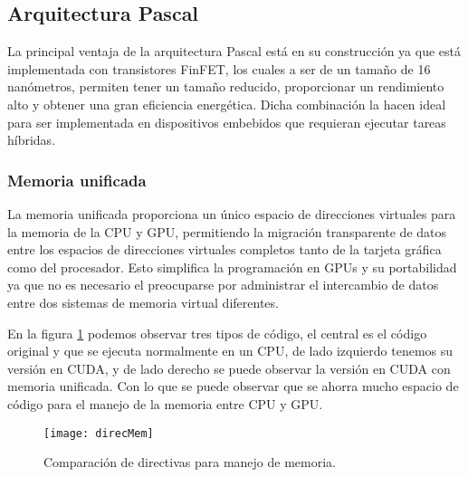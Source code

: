     \subsection{Arquitectura Pascal}\label{secc:arqPas}

    La principal ventaja de la arquitectura Pascal está en su construcción ya que está implementada con transistores FinFET\cite{PasGPU}, los cuales a ser de un tamaño de 16 nanómetros, permiten tener un tamaño reducido, proporcionar un rendimiento alto y obtener una gran eficiencia energética. Dicha combinación la hacen ideal para ser implementada en dispositivos embebidos que requieran ejecutar tareas híbridas.
                 
   \vspace{0.3cm}
   
    \subsubsection{Memoria unificada} \label{sec:MemUni}
     La memoria unificada proporciona un único espacio de direcciones virtuales para la memoria de la \acrshort{CPU} y \acrshort{GPU}, permitiendo la migración transparente de datos entre los espacios de direcciones virtuales completos tanto de la tarjeta gráfica como del procesador. Esto simplifica la programación en \acrshort{GPU}s y su portabilidad ya que no es necesario el  preocuparse por administrar el intercambio de datos entre dos sistemas de memoria virtual diferentes\cite{WPNV}.
                 
   \vspace{0.3cm}
   
     En la figura \ref{fig:direcMem} podemos observar tres tipos de código, el central es el código original y que se ejecuta normalmente en un CPU, de lado izquierdo tenemos su versión en CUDA, y de lado derecho se puede observar la versión en CUDA con memoria unificada. Con lo que se puede observar que se ahorra mucho espacio de código para el manejo de la memoria entre CPU y GPU.
       
  \begin{figure}[ht]
      \centering
        \texttt{[image: direcMem]}
        \caption{Comparación de directivas para manejo de memoria.}
        \label{fig:direcMem}
    \end{figure}
     
     
